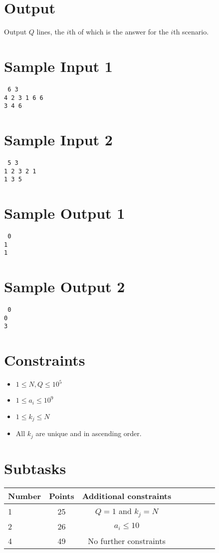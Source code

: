 \documentclass{article}
\begin{document}
\section*{Output}

Output $Q$ lines, the $i$th of which is the answer for the $i$th scenario.

\begin{multicols}{2}
\section*{Sample Input 1}
{\tt
6 3\\
4 2 3 1 6 6\\
3 4 6
}
\columnbreak
\section*{Sample Input 2}
{\tt
5 3\\
1 2 3 2 1\\
1 3 5
}
\end{multicols}
\begin{multicols}{2}
\section*{Sample Output 1}
{\tt
0\\
1\\
1
}
\columnbreak
\section*{Sample Output 2}
{\tt
0\\
0\\
3
}
\end{multicols}

\section*{Constraints}
\begin{itemize}
\item $1 \le N, Q \le 10^5$
\item $1 \le a_i \le 10^9$
\item $1 \le k_j \le N$
\item All $k_j$ are unique and in ascending order.
\end{itemize}

\section*{Subtasks}
\begin{tabular}{l*{6}{c}r}
Number & Points & Additional constraints\\
\hline
1 & 25 & $Q = 1$ and $k_j = N$ \\
2 & 26 & $a_i \le 10$ \\
4 & 49 & No further constraints
\end{tabular}
\end{document}
